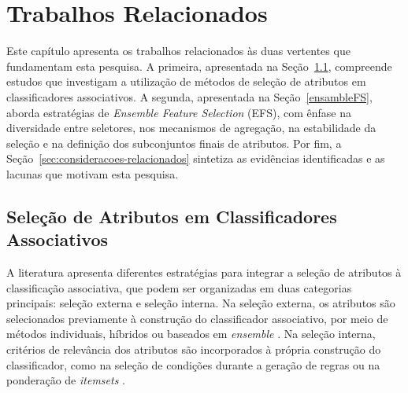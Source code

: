 
\chapter{Trabalhos Relacionados}
\label{trabRelac}

Este capítulo apresenta os trabalhos relacionados às duas vertentes que fundamentam esta pesquisa. A primeira, apresentada na Seção~\ref{sec:fs-ca}, compreende estudos que investigam a utilização de métodos de seleção de atributos em classificadores associativos. A segunda, apresentada na Seção~\ref{ensambleFS}, aborda estratégias de \textit{Ensemble Feature Selection} (EFS), com ênfase na diversidade entre seletores, nos mecanismos de agregação, na estabilidade da seleção e na definição dos subconjuntos finais de atributos. Por fim, a Seção~\ref{sec:consideracoes-relacionados} sintetiza as evidências identificadas e as lacunas que motivam esta pesquisa.

\section{Seleção de Atributos em Classificadores Associativos}
\label{sec:fs-ca}

A literatura apresenta diferentes estratégias para integrar a seleção de atributos à classificação associativa, que podem ser organizadas em duas categorias principais: seleção externa e seleção interna. Na seleção externa, os atributos são selecionados previamente à construção do classificador associativo, por meio de métodos individuais, híbridos ou baseados em \textit{ensemble} \cite{abubacker2017integrated,alagukumar2025impacts,alazaidah2021feature,alhawari2021classification,ashi2021enhancing,cicek2021assessment,ghareb2018enhanced,piri2019exploring,rad2024framework,sowan2023hybrid}. Na seleção interna, critérios de relevância dos atributos são incorporados à própria construção do classificador, como na seleção de condições durante a geração de regras ou na ponderação de \textit{itemsets} \cite{nandhini2022performance,wu2024novel}.

